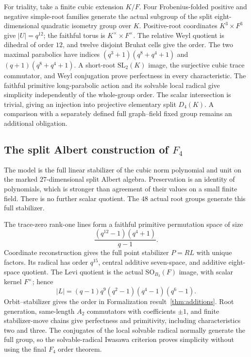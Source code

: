 \documentclass[11pt]{article}
\numberwithin{equation}{section}
\theoremstyle{definition}
\newcommand{\SL}{\mathrm{SL}}
\begin{document}
For triality, take a finite cubic extension $K/F$. Four Frobenius-folded
positive and negative simple-root families generate the actual subgroup
of the split eight-dimensional quadratic isometry group over $K$.
Positive-root coordinates $K^3\times F^3$ give $|U|=q^{12}$; the faithful
torus is $K^\times\times F^\times$. The relative Weyl quotient is
dihedral of order $12$, and twelve disjoint Bruhat cells give the order.
The two maximal parabolics have indices
$(q^3+1)(q^8+q^4+1)$ and $(q+1)(q^8+q^4+1)$.
A short-root $\SL_2(K)$ image, the surjective cubic trace commutator,
and Weyl conjugation prove perfectness in every characteristic. The
faithful primitive long-parabolic action and its solvable local radical
give simplicity independently of the whole-group order. The scalar
intersection is trivial, giving an injection into projective elementary
split $D_4(K)$. A comparison with a separately defined full graph--field
fixed group remains an additional obligation.

\subsection{The split Albert construction of \texorpdfstring{$F_4$}{F4}}

The model is the full linear stabilizer of the cubic norm polynomial and
unit on the marked $27$-dimensional split Albert algebra. Preservation
is an identity of polynomials, which is stronger than agreement of
their values on a small finite field. There is no further scalar quotient.
The $48$ actual root groups generate this full stabilizer.

The trace-zero rank-one lines form a faithful primitive permutation
space of size
\[
 \frac{(q^{12}-1)(q^4+1)}{q-1}.
\]
Coordinate reconstruction gives the full point stabilizer $P=RL$ with
unique factors. Its radical has order $q^{15}$, central additive
seven-space, and additive eight-space quotient. The Levi quotient is
the actual $\mathrm{SO}_{B_3}(F)$ image, with scalar kernel $F^\times$; hence
\[
 |L|=(q-1)q^9(q^2-1)(q^4-1)(q^6-1).
\]
Orbit--stabilizer gives the order in Formalization
result~\ref{thm:additions}. Root generation, same-length $A_2$
commutators with coefficients $\pm1$, and finite stabilizer-move chains
give perfectness and primitivity, including characteristics two and
three. The conjugates of the local solvable radical normally generate
the full group, so the solvable-radical Iwasawa criterion proves
simplicity without using the final $F_4$ order theorem.
\end{document}
